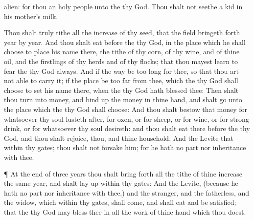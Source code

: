 {alien: for thou
{} an
holy
people unto the
{} thy
God. Thou shalt not
seethe a
kid in his
mother’s
milk.
\par }{\PP {}Thou shalt
truly
tithe all the
increase of thy
seed, that the
field bringeth
forth
year by
year.
And thou shalt
eat
before the
{} thy
God, in the
place which he shall
choose to
place his
name there, the
tithe of thy
corn, of thy
wine, and of thine
oil, and the
firstlings of thy
herds and of thy
flocks; that thou mayest
learn to
fear the
{} thy
God
always.
And if the
way be too
long for thee, so
that thou art not
able to
carry it;
{} if the
place be too
far from thee, which the
{} thy
God shall
choose to
set his
name there, when the
{} thy
God hath
blessed thee:
Then shalt thou
turn
{} into
money, and bind
up the
money in thine
hand, and shalt
go unto the
place which the
{} thy
God shall
choose:
And thou shalt
bestow that
money for whatsoever thy
soul lusteth
after, for
oxen, or for
sheep, or for
wine, or for strong
drink, or for whatsoever thy
soul
desireth: and thou shalt
eat there
before the
{} thy
God, and thou shalt
rejoice, thou, and thine
household,
And the
Levite that
{} within thy
gates; thou shalt not
forsake him; for he hath no
part nor
inheritance with thee.
\par }{\PP {}¶ At the
end of
three
years thou shalt bring
forth all the
tithe of thine
increase the same
year, and shalt lay
{}
up within thy
gates:
And the
Levite, (because he hath no
part nor
inheritance with thee,) and the
stranger, and the
fatherless, and the
widow, which
{} within thy
gates, shall
come, and shall
eat and be
satisfied; that the
{} thy
God may
bless thee in all the
work of thine
hand which thou
doest.

}
